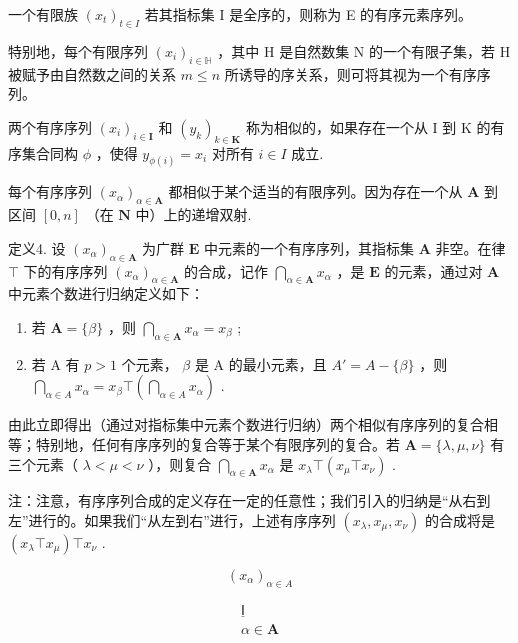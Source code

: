一个有限族 \((x_{t})_{t\in I}\) 若其指标集 I 是全序的，则称为 E 的有序元素序列。

特别地，每个有限序列 \((x_{i})_{i\in\mathbb{H}}\) ，其中 H 是自然数集 N 的一个有限子集，若 H 被赋予由自然数之间的关系 \(m \leqslant n\) 所诱导的序关系，则可将其视为一个有序序列。

两个有序序列 \((x_{i})_{i\in\mathbf{I}}\) 和 \((y_{k})_{k\in\mathbf{K}}\) 称为相似的，如果存在一个从 I 到 K 的有序集合同构 \(\phi\) ，使得 \(y_{\phi(i)} = x_{i}\) 对所有 \(i \in I\) 成立.

每个有序序列 \((x_{\alpha})_{\alpha \in \mathbf{A}}\) 都相似于某个适当的有限序列。因为存在一个从 \(\mathbf{A}\) 到区间 \([0, n]\) （在 \(\mathbf{N}\) 中）上的递增双射.

定义4. 设 \((x_{\alpha})_{\alpha \in \mathbf{A}}\) 为广群 \(\mathbf{E}\) 中元素的一个有序序列，其指标集 \(\mathbf{A}\) 非空。在律 \(\top\) 下的有序序列 \((x_{\alpha})_{\alpha \in \mathbf{A}}\) 的合成，记作 \(\bigcap_{\alpha \in \mathbf{A}} x_{\alpha}\) ，是 \(\mathbf{E}\) 的元素，通过对 \(\mathbf{A}\) 中元素个数进行归纳定义如下：

\begin{enumerate}
\def\labelenumi{(\arabic{enumi})}
\item
  若 \(\mathbf{A} = \{\beta\}\) ，则 \(\bigcap_{\alpha \in \mathbf{A}} x_{\alpha} = x_{\beta}\) ;
\item
  若 A 有 \(p > 1\) 个元素， \(\beta\) 是 A 的最小元素，且 \(A' = A - \{\beta\}\) ，则 \(\bigcap_{\alpha \in A} x_{\alpha} = x_{\beta} \top \left( \bigcap_{\alpha \in A} x_{\alpha} \right)\) .
\end{enumerate}

由此立即得出（通过对指标集中元素个数进行归纳）两个相似有序序列的复合相等；特别地，任何有序序列的复合等于某个有限序列的复合。若 \(\mathbf{A} = \{\lambda, \mu, \nu\}\) 有三个元素（ \(\lambda < \mu < \nu\) ），则复合 \(\bigcap_{\alpha \in \mathbf{A}} x_{\alpha}\) 是 \(x_{\lambda} \top (x_{\mu} \top x_{\nu})\) .

注：注意，有序序列合成的定义存在一定的任意性；我们引入的归纳是“从右到左”进行的。如果我们“从左到右”进行，上述有序序列 \((x_{\lambda}, x_{\mu}, x_{\nu})\) 的合成将是 \((x_{\lambda} \top x_{\mu}) \top x_{\nu}\) .

\[
\left(x _ {\alpha}\right) _ {\alpha \in A}
\]

\[
\begin{array}{c} \underline {{\mathsf {I}}} \\ \alpha \in \mathbf {A} \end{array}
\]

